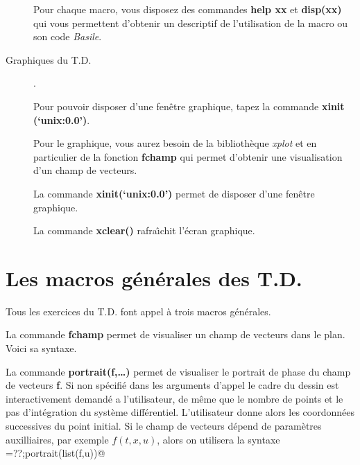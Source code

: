 \begin{description}
  Pour chaque macro, vous disposez des commandes {\bf help xx} et
 {\bf disp(xx)}
  qui vous permettent d'obtenir un descriptif de l'utilisation de la macro 
  ou  son code {\em Basile}.

\item[Graphiques du T.D.] .

Pour pouvoir disposer d'une fen\^etre graphique, tapez la commande 
{\bf xinit (`unix:0.0')}.

Pour le graphique, vous aurez besoin de la biblioth\`eque {\em xplot}
 et en  particulier de la  fonction  {\bf fchamp} 
qui permet d'obtenir une visualisation d'un champ de vecteurs.

La commande {\bf xinit(`unix:0.0')} permet de disposer
d'une fen\^etre graphique.

La commande {\bf xclear()} rafra\^{\i}chit l'\'ecran graphique.

\end{description}

\newpage

\def\tit#1{ \begin{center} \fbox{{\bf  #1}} \end{center}}

\def\cmarg{\hspace{1cm}}

\section{Les macros g\'en\'erales des T.D.}

Tous les exercices du T.D. font appel \`a trois macros g\'en\'erales.
\bigskip

\def\cmarg{\hspace{1cm}}

	\tit{fchamp}

La commande {\bf fchamp} permet de visualiser un champ de 
vecteurs dans le plan. Voici sa syntaxe.

\Mfchamp
\bigskip

\def\cmarg{\hspace{1cm}}

	\tit{portrait}


La commande {\bf portrait(f,\ldots)} permet de visualiser le portrait de phase
du champ de vecteurs {\bf f}. Si non sp\'ecifi\'e dans les arguments d'appel
le cadre du dessin est
interactivement demand\'e a l'utilisateur, de m\^eme que le nombre de
points et le pas d'int\'egration du syst\`eme diff\'erentiel.
L'utilisateur donne alors les coordonn\'ees successives du point
initial. Si le champ de vecteurs d\'epend de param\`etres auxilliaires, par exemple  $f(t,x,u)$, alors on utilisera la syntaxe 
\verb@u=??;portrait(list(f,u))@  

